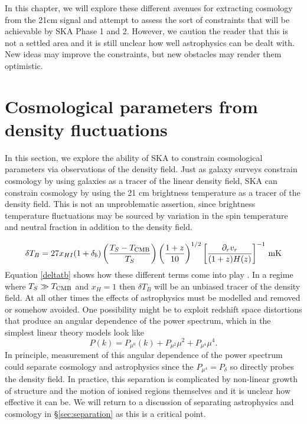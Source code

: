 \documentclass{PoS}
\begin{document}
In this chapter, we will explore these different avenues for extracting cosmology from the 21cm signal and attempt to assess the sort of constraints that will be achievable by SKA Phase 1 and 2. However, we caution the reader that this is not a settled area and it is still unclear how well astrophysics can be dealt with. New ideas may improve the constraints, but new obstacles may render them optimistic.

\section{Cosmological parameters from density fluctuations}

In this section, we explore the ability of SKA to constrain cosmological parameters via observations of the density field. Just as galaxy surveys constrain cosmology by using galaxies as a tracer of the linear density field, SKA can constrain cosmology by using the 21 cm brightness temperature as a tracer of the density field. This is not an unproblematic assertion, since brightness temperature fluctuations may be sourced by variation in the spin temperature and neutral fraction in addition to the density field. 

\begin{equation}\label{deltatb}
\delta T_B=27x_{HI}(1+\delta_b)\left(\frac{T_S-T_{\rm CMB}}{T_S}\right)\left(\frac{1+z}{10}\right)^{1/2}\left[\frac{\partial_rv_r}{(1+z)H(z)}\right]^{-1}{\rm\,mK}
\end{equation}
Equation \ref{deltatb} shows how these different terms come into play \citep{2006PhR...433..181F}. In a regime where $T_S\gg T_{\rm CMB}$ and $x_H=1$ then $\delta T_B$ will be an unbiased tracer of the density field. At all other times the effects of astrophysics must be modelled and removed or somehow avoided. One possibility might be to exploit redshift space distortions that produce an angular dependence of the power spectrum, which in the simplest linear theory models look like
\begin{equation}
P(k)=P_{\mu^0}(k)+P_{\mu^2}\mu^2+P_{\mu^4}\mu^4.
\end{equation}
In principle, measurement of this angular dependence of the power spectrum could separate cosmology and astrophysics since the $P_{\mu^4}=P_\delta$ so directly probes the density field. In practice, this separation is complicated by non-linear growth of structure \citep{2008PhRvD..78j3512S, 2012MNRAS.422..926M} and the motion of ionised regions themselves \citep{2006ApJ...653..815M} and it is unclear how effective it can be. We will return to a discussion of separating astrophysics and cosmology in \S\ref{sec:separation} as this is a critical point. 
\end{document}
